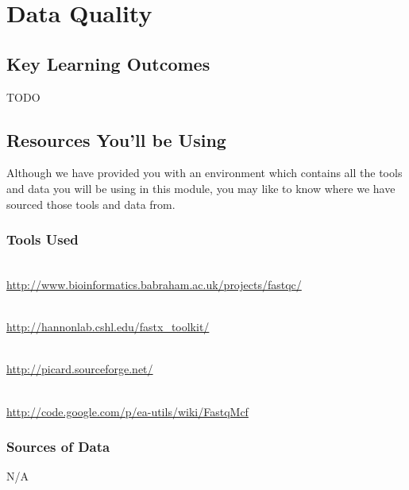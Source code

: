 \renewcommand{\moduleTitle}{Data Quality}
\renewcommand{\moduleAuthors}{%
  Sonika Tyagi \mailto{sonika.tyagi@agrf.org.au}
} \renewcommand{\moduleContributions}{%
  Nathan S. Watson-Haigh \mailto{nathan.watson-haigh@awri.com.au}%
}

\chapter{\moduleTitle}
\newpage

\section{Key Learning Outcomes}

TODO

\section{Resources You'll be Using}
Although we have provided you with an environment which contains all the tools
and data you will be using in this module, you may like to know where we have
sourced those tools and data from.
 
\subsection{Tools Used}
\begin{description}[style=multiline,labelindent=0cm,align=left,leftmargin=0.5cm]
  \item[FastQC]\hfill\\
  	\url{http://www.bioinformatics.babraham.ac.uk/projects/fastqc/}
  \item[fastx-toolkit]\hfill\\
  	\url{http://hannonlab.cshl.edu/fastx_toolkit/}
  \item[picard]\hfill\\
  	\url{http://picard.sourceforge.net/}
  \item[fastqmcf]\hfill\\
  	\url{http://code.google.com/p/ea-utils/wiki/FastqMcf}
\end{description}

\subsection{Sources of Data}
N/A

